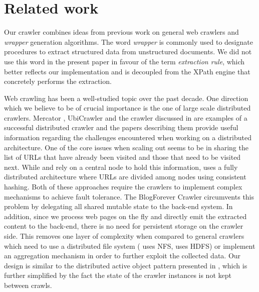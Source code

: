 \section{Related work}
\label{relatedwork}

Our crawler combines ideas from previous work on general web crawlers and \emph{wrapper} generation algorithms. The word \emph{wrapper} is commonly used to designate procedures to extract structured data from unstructured documents. We did not use this word in the present paper in favour of the term \emph{extraction rule}, which better reflects our implementation and is decoupled from the XPath engine that concretely performs the extraction.

Web crawling has been a well-studied topic over the past decade. One direction which we believe to be of crucial importance is the one of large scale distributed crawlers. Mercator \cite{heydon99mercator}, UbiCrawler \cite{boldi2003} and the crawler discussed in \cite{shkapenyuk2002} are examples of a successful distributed crawler and the papers describing them provide useful information regarding the challenges encountered when working on a distributed architecture. One of the core issues when scaling out seems to be in sharing the list of URLs that have already been visited and those that need to be visited next. While \cite{heydon99mercator} and \cite{shkapenyuk2002} rely on a central node to hold this information, \cite{boldi2003} uses a fully distributed architecture where URLs are divided among nodes using consistent hashing. Both of these approaches require the crawlers to implement complex mechanisms to achieve fault tolerance. The BlogForever Crawler circumvents this problem by delegating all shared mutable state to the back-end system. In addition, since we process web pages on the fly and directly emit the extracted content to the back-end, there is no need for persistent storage on the crawler side. This removes one layer of complexity when compared to general crawlers which need to use a distributed file system (\cite{shkapenyuk2002} uses NFS, \cite{berger2011} uses HDFS) or implement an aggregation mechanism in order to further exploit the collected data. Our design is similar to the distributed active object pattern presented in \cite{activeobject1996}, 
which is further simplified by the fact the state of the crawler instances is not kept between crawls.

